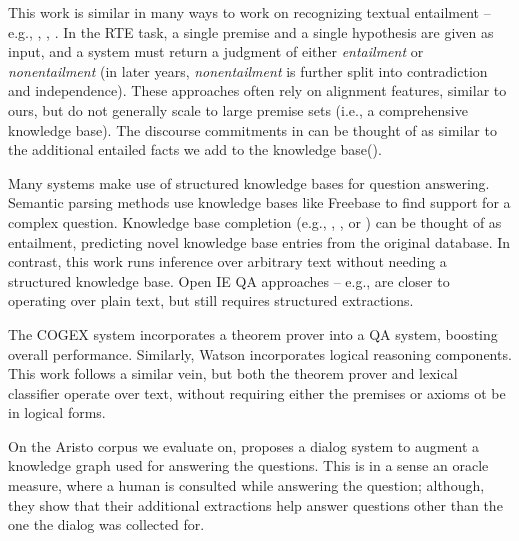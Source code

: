 This work is similar in many ways to work on 
  recognizing textual entailment -- e.g., 
  , ,
  .
In the RTE task, a single premise and a single hypothesis are given as input,
  and a system must return a judgment of either \textit{entailment} or
  \textit{nonentailment} (in later years, \textit{nonentailment} is further
  split into contradiction and independence).
These approaches often rely on alignment features, similar to ours, but
  do not generally scale to large premise sets (i.e., a comprehensive
  knowledge base).
The discourse commitments in  can be thought
  of as similar to the additional entailed facts we add to the
  knowledge base().

Many systems make use of structured knowledge bases for question
  answering.
Semantic parsing methods 
  \cite{key:2005zettlemoyer-semantics,key:2011liang-semantics}
  use knowledge bases like Freebase to find support for a
  complex question.
Knowledge base completion 
  (e.g., , ,
  or ) can be thought of as entailment,
  predicting novel knowledge base entries from the original database.
In contrast, this work runs inference over arbitrary text without
  needing a structured knowledge base.
Open IE \cite{key:2010wu-openie,key:2012mausam-ollie}
  QA approaches -- e.g., 
  are closer to operating over plain text, but
  still requires structured extractions.

The COGEX system \cite{key:2003moldovan-trec} incorporates a theorem
  prover into a QA system, boosting overall performance.
Similarly, Watson \cite{key:2010ferrucci-watson} incorporates
  logical reasoning components.
This work follows a similar vein, but both the theorem prover
  and lexical classifier operate over text, without requiring either
  the premises or axioms ot be in logical forms.
  

On the Aristo corpus we evaluate on,  proposes
  a dialog system to augment a knowledge graph used for answering the questions.
This is in a sense an oracle measure, where a human is consulted while answering
  the question; although, they show that their additional extractions help
  answer questions other than the one the dialog was collected for.



